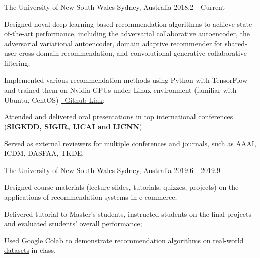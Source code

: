 

\begin{cventries}

  {The University of New South Wales} %
  {Sydney, Australia} %
  {2018.2 - Current} %
  {
    \begin{cvitems} %
      \item Designed noval deep learning-based recommendation algorithms to achieve state-of-the-art performance, including the adversarial collaborative autoencoder, the adversarial variational autoencoder, domain adaptive recommender for shared-user cross-domain recommendation, and convolutional generative collaborative filtering;
      \item Implemented various recommendation methods using Python with TensorFlow and trained them on Nvidia GPUs under Linux environment (familiar with Ubuntu, CentOS) \href{https://github.com/bennetyf/RecSys}{\faGithub~Github Link};
      \item Attended and delivered oral presentations in top international conferences (\textbf{SIGKDD, SIGIR, IJCAI and IJCNN}).
      \item Served as external reviewers for multiple conferences and journals, such as AAAI, ICDM, DASFAA, TKDE.
    \end{cvitems}
  }

    {The University of New South Wales} %
    {Sydney, Australia} %
    {2019.6 - 2019.9} %
    {
      \begin{cvitems} %
        \item Designed course materials (lecture slides, tutorials, quizzes, projects) on the applications of recommendation systems in e-commerce;
        \item Delivered tutorial to Master's students, instructed students on the final projects and evaluated students' overall performance;
        \item Used Google Colab to demonstrate recommendation algorithms on real-world \href{http://cseweb.ucsd.edu/~jmcauley/datasets.html}{\underline{datasets}} in class.
      \end{cvitems}
  }


\end{cventries}
